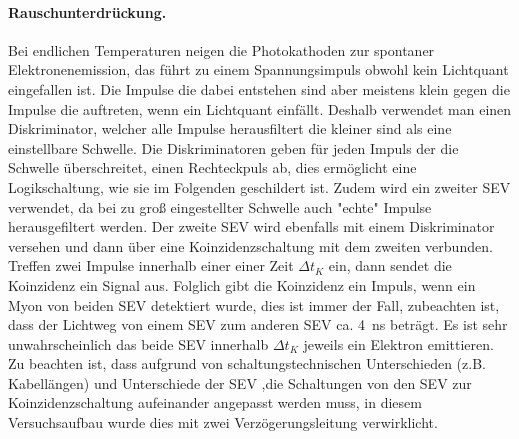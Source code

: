 \paragraph{Rauschunterdrückung.}
Bei endlichen Temperaturen neigen die Photokathoden zur spontaner Elektronenemission, 
das führt zu einem Spannungsimpuls obwohl kein Lichtquant eingefallen ist. Die Impulse 
die dabei entstehen sind 
aber meistens klein gegen die Impulse die auftreten, wenn ein Lichtquant einfällt. 
Deshalb verwendet man einen 
Diskriminator, welcher alle Impulse herausfiltert die kleiner sind als eine einstellbare Schwelle. 
Die Diskriminatoren geben für jeden Impuls der die Schwelle überschreitet, einen Rechteckpuls ab, 
dies ermöglicht eine Logikschaltung, wie sie im Folgenden geschildert ist. Zudem wird 
ein zweiter SEV verwendet, da bei zu groß eingestellter Schwelle auch "echte" Impulse herausgefiltert werden. 
Der zweite SEV wird ebenfalls mit einem Diskriminator versehen und dann über eine Koinzidenzschaltung mit dem 
zweiten verbunden. Treffen zwei Impulse innerhalb einer einer Zeit $\Delta t_K$ ein, dann sendet die 
Koinzidenz ein Signal aus. Folglich gibt die Koinzidenz ein Impuls, wenn ein Myon von beiden SEV detektiert 
wurde, dies ist immer der Fall, zubeachten ist, dass der Lichtweg von einem SEV zum anderen SEV ca. 
\SI{4}{\nano\second} beträgt. Es ist sehr 
unwahrscheinlich das beide SEV innerhalb $\Delta t_K$ jeweils ein Elektron emittieren. 
Zu beachten ist, dass aufgrund von schaltungstechnischen Unterschieden 
(z.B. Kabellängen) und Unterschiede der SEV ,die Schaltungen von den SEV zur Koinzidenzschaltung 
aufeinander angepasst werden muss, in 
diesem Versuchsaufbau wurde dies mit zwei Verzögerungsleitung verwirklicht.




